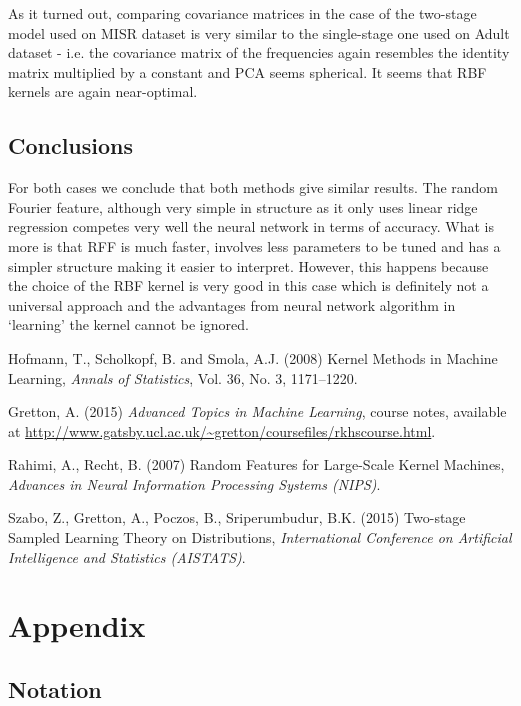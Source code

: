 \documentclass{article} %
\begin{document}
As it turned out, comparing covariance matrices in the case of the two-stage model used on MISR dataset is very similar to the single-stage one used on Adult dataset - i.e. the covariance matrix of the frequencies again resembles the identity matrix multiplied by a constant and PCA seems spherical. It seems that RBF kernels are again near-optimal.
\subsection{Conclusions}
For both cases we conclude that both methods give similar results. The random Fourier feature, although very simple in structure as it only uses linear ridge regression competes very well the neural network in terms of accuracy. What is more is that RFF is much faster,  involves less parameters to be tuned and has a simpler structure making it easier to interpret. However, this happens because the choice of the RBF kernel is very good in this case which is definitely not a universal approach and the advantages from neural network algorithm in `learning' the kernel cannot be ignored.

\begin{thebibliography}{20}
	Hofmann, T., Scholkopf, B. and Smola, A.J.
	(2008)
	Kernel Methods in Machine Learning,
	\textit{Annals of Statistics}, Vol. 36, No. 3, 1171–1220.
	
	
	Gretton, A.
	(2015)
	\textit{Advanced Topics in Machine Learning}, course notes, available at \url{http://www.gatsby.ucl.ac.uk/~gretton/coursefiles/rkhscourse.html}.
	
	Rahimi, A., Recht, B.
	(2007)
	Random Features for Large-Scale Kernel Machines,
	\textit{Advances in Neural Information Processing Systems (NIPS)}.
	
	Szabo, Z., Gretton, A., Poczos, B., Sriperumbudur, B.K.
	(2015)
	Two-stage Sampled Learning Theory on Distributions,
	\textit{International Conference on Artificial Intelligence and Statistics (AISTATS)}.
	
\end{thebibliography}

\section{Appendix}

\subsection{Notation}
\end{document}
